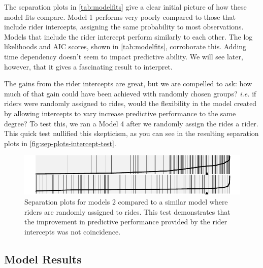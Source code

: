 \documentclass[]{article}
\begin{document}
The separation plots in \autoref{tab:modelfits} give a clear initial
picture of how these model fits compare. Model 1 performs very poorly
compared to those that include rider intercepts, assigning the same
probability to most observations. Models that include the rider
intercept perform similarly to each other. The log likelihoods and AIC
scores, shown in \autoref{tab:modelfits}, corroborate this. Adding time
dependency doesn't seem to impact predictive ability. We will see later,
however, that it gives a fascinating result to interpret.

The gains from the rider intercepts are great, but we are compelled to
ask: how much of that gain could have been achieved with randomly chosen
groups? \textit{i.e.} if riders were randomly assigned to rides, would
the flexibility in the model created by allowing intercepts to vary
increase predictive performance to the same degree? To test this, we ran
a Model 4 after we randomly assign the rides a rider. This quick test
nullified this skepticism, as you can see in the resulting separation
plots in \autoref{fig:sep-plots-intercept-test}.

\begin{figure}[tbh]
\centering
\includegraphics[angle = 0,scale = 1]{figure/intercept_test_plot.pdf}
\caption[Separation plots for models 2 compared to a similar model where
riders are randomly assigned to rides. This test demonstrates that the 
improvement in predictive performance provided by the rider intercepts
was not coincidence.]{\normalsize{Separation plots for models 2 compared to a similar model where
riders are randomly assigned to rides. This test demonstrates that the 
improvement in predictive performance provided by the rider intercepts
was not coincidence.}}
\label{fig:sep-plots-intercept-test}
\end{figure}

\subsection{Model Results}\label{model-results}
\end{document}
